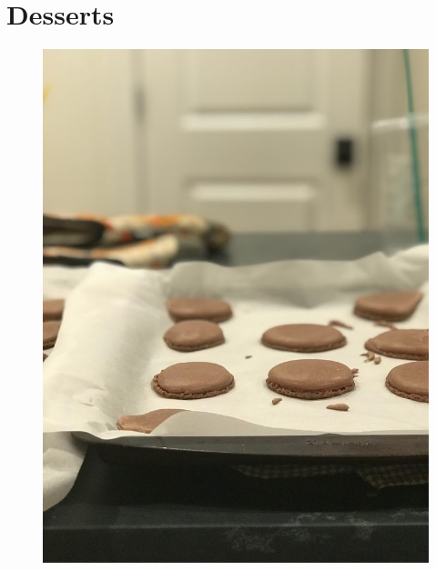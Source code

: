 \documentclass[11pt]{report}
\begin{document}
\chapter{Desserts}
\begin{figure}[h]
\begin{center}
   \includegraphics[width=0.65\linewidth]{images/IMG_2198.jpg}
\end{center}
\end{figure}
\newpage




























\end{document}
